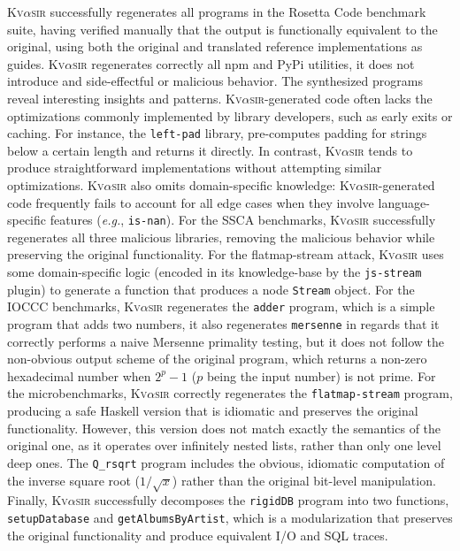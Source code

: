 \documentclass[nonacm,sigplan,review]{acmart}
\def\eg{{\em e.g.}, }
\newcommand{\sys}{{\scshape Kv{$\alpha$}sir}\xspace}
\newcommand{\ttt}[1]{\texttt{#1}\xspace}
\begin{document}
\sys successfully regenerates all programs in the Rosetta Code benchmark suite,
having verified manually that the output is functionally equivalent
to the original, using both the original and translated reference
implementations as guides.
\sys regenerates correctly all npm and PyPi utilities, it does not introduce and side-effectful or malicious behavior.
The synthesized programs reveal interesting insights and patterns.
\sys-generated code often lacks the optimizations commonly
implemented by library developers, such as early exits or caching.
For instance, the \texttt{left-pad} library, pre-computes padding for strings below a certain length
and returns it directly.
In contrast, \sys tends to produce straightforward
implementations without attempting similar optimizations.
\sys also omits domain-specific knowledge:
\sys-generated code frequently fails to account for all edge cases when they involve language-specific features (\eg \ttt{is-nan}).
For the SSCA benchmarks, \sys successfully regenerates all three malicious libraries, removing the malicious behavior while preserving the original functionality.
For the flatmap-stream attack, \sys uses some domain-specific logic (encoded in its knowledge-base by the \ttt{js-stream} plugin) to generate a function that produces a node \ttt{Stream} object.
For the IOCCC benchmarks, \sys regenerates the \ttt{adder} program, which is a simple program that adds two numbers,
it also regenerates \ttt{mersenne} in regards that it correctly performs a naive Mersenne primality testing, but it does not follow the non-obvious output scheme of the original program, which returns a non-zero hexadecimal number when $2^p - 1$ ($p$ being the input number) is not prime.
For the microbenchmarks, \sys correctly regenerates the \ttt{flatmap-stream} program, producing a safe Haskell version that is idiomatic and preserves the original functionality.
However, this version does not match exactly the semantics of the original one, as it operates over infinitely nested lists, rather than only one level deep ones.
The \ttt{Q\_rsqrt} program includes the obvious, idiomatic computation of the inverse square root ($1/\sqrt{x}$) rather than the original bit-level manipulation.
Finally, \sys successfully decomposes the \ttt{rigidDB} program into two
functions, \ttt{setupDatabase} and \ttt{getAlbumsByArtist}, which is a
modularization that preserves the original functionality and produce equivalent I/O and SQL traces.
\end{document}

